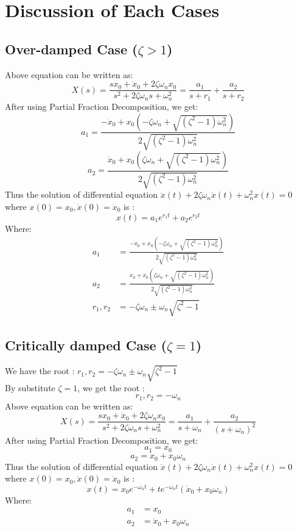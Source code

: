 \section{Discussion of Each Cases}
\subsection{Over-damped Case ($ \zeta > 1$)}
Above equation can be written as:
\[ 
X(s) = \frac{sx_0 + \dot{x}_0 + 2\zeta\omega_nx_0}{s^2 + 2\zeta\omega_ns+\omega_n^2} = \frac{a_1}{s+r_1}+\frac{a_2}{s+r_2}
\]
After using Partial Fraction Decomposition, we get:
\[ 
a_1 = \frac{-\dot{x}_0 + x_0 (-\zeta \omega_n + \sqrt{(\zeta^2-1)\omega_n^2})}{2\sqrt{(\zeta^2-1)\omega_n^2}}
\]
\[ 
a_2 = \frac{\dot{x}_0 + x_0 (\zeta \omega_n + \sqrt{(\zeta^2-1)\omega_n^2})}{2\sqrt{(\zeta^2-1)\omega_n^2}}
\]
Thus the solution of differential equation $ \ddot{x}(t)+2\zeta\omega_n\dot{x}(t)+\omega_n^2x(t)=0  $ where $ x(0)=x_0, \dot{x}(0) = \dot{x}_0 $ is :
\[ 
x(t) = a_1e^{r_1t}+a_2e^{r_2t} 
\]
Where:
\[
\begin{split}
	a_1 &= \frac{-\dot{x}_0 + x_0 (-\zeta \omega_n + \sqrt{(\zeta^2-1)\omega_n^2})}{2\sqrt{(\zeta^2-1)\omega_n^2}} \\
	a_2 &= \frac{\dot{x}_0 + x_0 (\zeta \omega_n + \sqrt{(\zeta^2-1)\omega_n^2})}{2\sqrt{(\zeta^2-1)\omega_n^2}} \\
	r_1,r_2 &= -\zeta\omega_n \pm \omega_n\sqrt{\zeta^2-1}
\end{split} 
\]

\subsection{Critically damped Case ($ \zeta = 1$)}
We have the root : $ r_1,r_2 = -\zeta\omega_n \pm \omega_n\sqrt{\zeta^2-1} $\\
By substitute $ \zeta = 1 $, we get the root : 
\[ r_1,r_2 = -\omega_n \]
Above equation can be written as:
\[ 
X(s) = \frac{sx_0 + \dot{x}_0 + 2\zeta\omega_nx_0}{s^2 + 2\zeta\omega_ns+\omega_n^2} = \frac{a_1}{s+\omega_n}+\frac{a_2}{(s+\omega_n)^2}
\]
After using Partial Fraction Decomposition, we get:
\[ 
a_1 = x_0
\]
\[ 
a_2 = \dot{x}_0 + x_0\omega_n
\]
Thus the solution of differential equation $ \ddot{x}(t)+2\zeta\omega_n\dot{x}(t)+\omega_n^2x(t)=0  $ where $ x(0)=x_0, \dot{x}(0) = \dot{x}_0 $ is :
\[ 
x(t) = x_0e^{-\omega_nt}+te^{-\omega_nt}(\dot{x}_0+x_0\omega_n)
\]
Where:
\[
\begin{split}
	a_1 &= x_0\\
	a_2 &= \dot{x}_0 + x_0\omega_n
\end{split} 
\]



